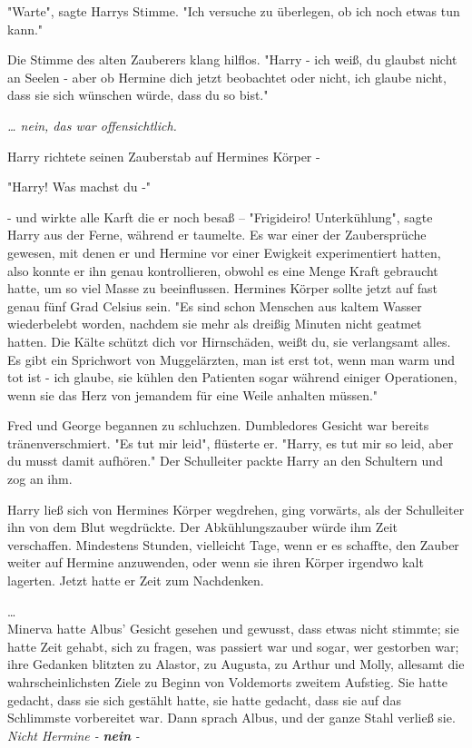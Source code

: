 {"Warte", sagte Harrys Stimme. "Ich versuche zu überlegen, ob ich noch etwas tun kann."

Die Stimme des alten Zauberers klang hilflos. "Harry - ich weiß, du glaubst nicht an Seelen - aber ob Hermine dich jetzt beobachtet oder nicht, ich glaube nicht, dass sie sich wünschen würde, dass du so bist."

\emph{… nein, das war offensichtlich.}

Harry richtete seinen Zauberstab auf Hermines Körper -

"Harry! Was machst du -"

- und wirkte alle Karft die er noch besaß -- "Frigideiro! Unterkühlung", sagte Harry aus der Ferne, während er taumelte. Es war einer der Zaubersprüche gewesen, mit denen er und Hermine vor einer Ewigkeit experimentiert hatten, also konnte er ihn genau kontrollieren, obwohl es eine Menge Kraft gebraucht hatte, um so viel Masse zu beeinflussen. Hermines Körper sollte jetzt auf fast genau fünf Grad Celsius sein. "Es sind schon Menschen aus kaltem Wasser wiederbelebt worden, nachdem sie mehr als dreißig Minuten nicht geatmet hatten. Die Kälte schützt dich vor Hirnschäden, weißt du, sie verlangsamt alles. Es gibt ein Sprichwort von Muggelärzten, man ist erst tot, wenn man warm und tot ist - ich glaube, sie kühlen den Patienten sogar während einiger Operationen, wenn sie das Herz von jemandem für eine Weile anhalten müssen."

Fred und George begannen zu schluchzen. Dumbledores Gesicht war bereits tränenverschmiert. "Es tut mir leid", flüsterte er. "Harry, es tut mir so leid, aber du musst damit aufhören." Der Schulleiter packte Harry an den Schultern und zog an ihm.

Harry ließ sich von Hermines Körper wegdrehen, ging vorwärts, als der Schulleiter ihn von dem Blut wegdrückte. Der Abkühlungszauber würde ihm Zeit verschaffen. Mindestens Stunden, vielleicht Tage, wenn er es schaffte, den Zauber weiter auf Hermine anzuwenden, oder wenn sie ihren Körper irgendwo kalt lagerten. Jetzt hatte er Zeit zum Nachdenken.

…\\ Minerva hatte Albus' Gesicht gesehen und gewusst, dass etwas nicht stimmte; sie hatte Zeit gehabt, sich zu fragen, was passiert war und sogar, wer gestorben war; ihre Gedanken blitzten zu Alastor, zu Augusta, zu Arthur und Molly, allesamt die wahrscheinlichsten Ziele zu Beginn von Voldemorts zweitem Aufstieg. Sie hatte gedacht, dass sie sich gestählt hatte, sie hatte gedacht, dass sie auf das Schlimmste vorbereitet war. Dann sprach Albus, und der ganze Stahl verließ sie.\\ \emph{Nicht Hermine -} \textbf{\emph{nein}} \emph{-}

}
